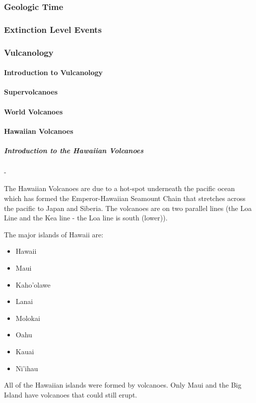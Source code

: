 			\subsubsection{Geologic Time}
			\subsubsection{Extinction Level Events}
			\subsubsection{Vulcanology}
			\paragraph{Introduction to Vulcanology}
			\paragraph{Supervolcanoes}
			\paragraph{World Volcanoes}
			\newpage
			\paragraph{Hawaiian Volcanoes}
				\subparagraph{Introduction to the Hawaiian Volcanoes} - 

					The Hawaiian Volcanoes are due to a hot-spot underneath the pacific ocean which has formed the Emperor-Hawaiian Seamount Chain that stretches across the pacific to Japan and Siberia.  The volcanoes are on two parallel lines (the Loa Line and the Kea line - the Loa line is south (lower)).   

					The major islands of Hawaii are: 
					\begin{multicols}{2}
					\begin{itemize}
						\item Hawaii
						\item Maui
						\item Kaho'olawe
						\item Lanai
						\item Molokai
						\item Oahu
						\item Kauai
						\item Ni'ihau
					\end{itemize}
					\end{multicols}
					All of the Hawaiian islands were formed by volcanoes.  Only Maui and the Big Island have volcanoes that could still erupt.  

